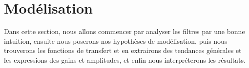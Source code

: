 \section{Modélisation}

Dans cette section, nous allons commencer par analyser les filtres
par une bonne intuition,
ensuite nous poserons nos hypothèses de modélisation,
puis nous trouverons les fonctions de transfert et en extrairons
des tendances générales
et les expressions des gains et amplitudes,
et enfin nous interpréterons les résultats.







